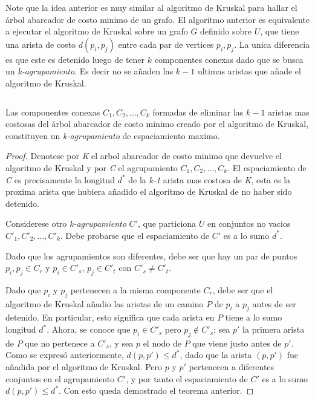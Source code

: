 \documentclass[spanish]{llncs}
\begin{document}
Note que la idea anterior es muy similar al algoritmo de Kruskal para hallar el
árbol abarcador de costo minimo de un grafo. El algoritmo anterior es equivalente
a ejecutar el algoritmo de Kruskal sobre un grafo $G$ definido sobre $U$, que tiene
una arista de costo $d(p_i,p_j)$ entre cada par de vertices $p_i,p_j$. La unica
diferencia es que este es detenido luego de tener $k$ componentes conexas dado que
se busca un \emph{k-agrupamiento}. Es decir no se añaden las $k-1$ ultimas aristas
que añade el algoritmo de Kruskal.

\inputminted{python}{code.py}


\begin{theorem}
	Las componentes conexas $C_1,C_2,\dots,C_k$ formadas de eliminar
	las $k-1$ aristas mas costosas del árbol abarcador de costo minimo
	creado por el algoritmo de Kruskal, constituyen un \emph{k-agrupamiento}
	de espaciamiento maximo.
\end{theorem}

\begin{proof}
	Denotese por \emph{K} el arbol abarcador de costo minimo que devuelve
	el algoritmo de Kruskal y por \emph{C} el agrupamiento $C_1,C_2,\dots,C_k$.
	El espaciamiento de \emph{C} es precisamente la longitud $d^*$ de la
	\emph{k-1} arista mas costosa de \emph{K}, esta es la proxima arista que
	hubiera añadido el algoritmo de Kruskal de no haber sido detenido.

	Considerese otro \emph{k-agrupamiento} $C'$, que particiona $U$ en conjuntos
	no vacios $C'_1,C'_2,\dots,C'_k$. Debe probarse que el espaciamiento de $C'$
	es a lo sumo $d^*$.

	Dado que los agrupamientos son diferentes, debe ser que hay un par de puntos
	$p_i,p_j \in C_r$ y $p_i \in C'_s$, $p_j \in C'_t$ con $C'_s \neq C'_t$.

	Dado que $p_i$ y $p_j$ pertenecen a la misma componente $C_r$, debe ser que el
	algoritmo de Kruskal añadio las aristas de un camino $P$ de $p_i$ a $p_j$ antes
	de ser detenido. En particular, esto significa que cada arista en $P$ tiene a lo
	sumo longitud $d^*$. Ahora, se conoce que $p_i \in C'_s$ pero $p_j \notin C'_s$;
	sea $p'$ la primera arista de $P$ que no pertenece a $C'_s$, y sea $p$ el nodo
	de $P$ que viene justo antes de $p'$. Como se expresó anteriormente,
	$d(p,p') \le d^*$, dado que la arista $(p,p')$ fue añadida por el algoritmo
	de Kruskal. Pero $p$ y $p'$ pertenecen a diferentes conjuntos en el agrupamiento
	$C'$, y por tanto el espaciamiento de $C'$ es a lo sumo $d(p,p') \le d^*$. Con esto
	queda demostrado el teorema anterior.
\end{proof}
\end{document}

